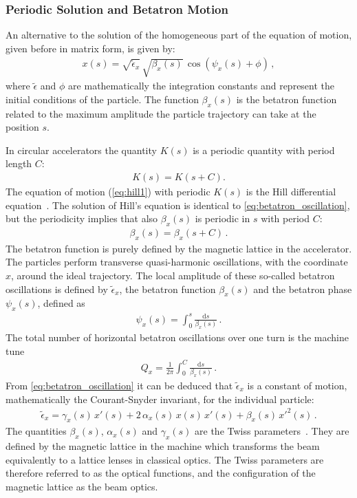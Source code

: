 \subsubsection{Periodic Solution and Betatron Motion}
An alternative to the solution of the homogeneous part of the equation of motion, given before in matrix form, is given by: 
%
\begin{align}
x(s) = \sqrt{\tilde{\epsilon}_x} \, \sqrt{\beta_x(s)} \, \cos \left( \psi_x(s) + \phi \right) \, , \label{eq:betatron_oscillation}
\end{align}
%
where $\tilde{\epsilon}$ and $\phi$ are mathematically the integration constants and represent the initial conditions of the particle. The function $\beta_x(s)$ is the betatron function related to the maximum amplitude the particle trajectory can take at the position $s$. 

In circular accelerators the quantity $K(s)$ is a periodic quantity with period length $C$:
\begin{align}
K(s) = K(s+C) .
\end{align}
The equation of motion (\ref{eq:hill1}) with periodic $K(s)$ is the Hill differential equation~\cite{wiedemann1999particle}. The solution of Hill's equation is identical to \eqref{eq:betatron_oscillation}, but the periodicity implies that also $\beta_x(s)$ is periodic in $s$ with period $C$:
%
\begin{align}
  \beta_x (s) = \beta_x (s+C) \, .
\end{align}
The betatron function is purely defined by the magnetic lattice in the accelerator. The particles perform transverse quasi-harmonic oscillations, with the coordinate $x$, around the ideal trajectory. The local amplitude of these so-called betatron oscillations is defined by $\tilde{\epsilon}_x$, the betatron function $\beta_x(s)$ and the betatron phase $\psi_x(s)$, defined as
%
\begin{align}
  \psi_x(s) = \int_0^s \frac{\mathrm{d}s}{\beta_x(s)} \, .
\end{align}
%
The total number of horizontal betatron oscillations over one turn is the machine tune
%
\begin{align}
  Q_x = \frac{1}{2 \pi} \int_0^C \frac{\mathrm{d}s}{\beta_x(s)} \, .
\end{align}
%
%
From \eqref{eq:betatron_oscillation} it can be deduced that $\tilde{\epsilon}_x$ is a constant of motion, mathematically the Courant-Snyder invariant, for the individual particle:
%
\begin{align}
\tilde{\epsilon}_x = \gamma_x(s) \, x'(s) + 2 \, \alpha_x(s) \, x(s) \, x'(s) + \beta_x(s) \, x'^2 (s) \, . \label{eq:parameric_ellipse}
\end{align}
%
The quantities $\beta_x(s)$, $\alpha_x(s)$ and $\gamma_x(s)$ are the Twiss parameters~\cite{wiedemann1999particle}. They are defined by the magnetic lattice in the machine which transforms the beam equivalently to a lattice lenses in classical optics. The Twiss parameters are therefore referred to as the optical functions, and the configuration of the magnetic lattice as the beam optics.

